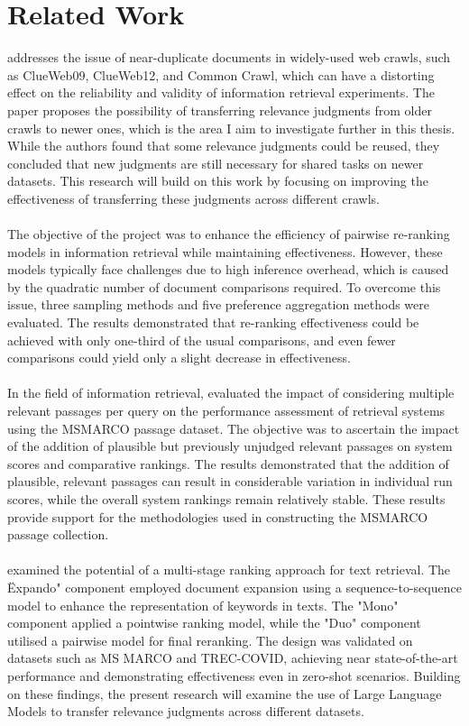 \chapter{Related Work}\label{related-work}

\cite{froebe:2021} addresses the issue of near-duplicate documents in widely-used web crawls, such as ClueWeb09, ClueWeb12, and Common Crawl, which can have a distorting effect on the reliability and validity of information retrieval experiments. The paper proposes the possibility of transferring relevance judgments from older crawls to newer ones, which is the area I aim to investigate further in this thesis. While the authors found that some relevance judgments could be reused, they concluded that new judgments are still necessary for shared tasks on newer datasets. This research will build on this work by focusing on improving the effectiveness of transferring these judgments across different crawls.
\\\\
The objective of the \citet{gienapp:2022} project was to enhance the efficiency of pairwise re-ranking models in information retrieval while maintaining effectiveness. However, these models typically face challenges due to high inference overhead, which is caused by the quadratic number of document comparisons required. To overcome this issue, three sampling methods and five preference aggregation methods were evaluated. The results demonstrated that re-ranking effectiveness could be achieved with only one-third of the usual comparisons, and even fewer comparisons could yield only a slight decrease in effectiveness.
\\\\
In the field of information retrieval, \citet{mackenzie:2021} evaluated the impact of considering multiple relevant passages per query on the performance assessment of retrieval systems using the MSMARCO passage dataset. The objective was to ascertain the impact of the addition of plausible but previously unjudged relevant passages on system scores and comparative rankings. The results demonstrated that the addition of plausible, relevant passages can result in considerable variation in individual run scores, while the overall system rankings remain relatively stable. These results provide support for the methodologies used in constructing the MSMARCO passage collection.
\\\\
\citet{pradeep:2021} examined the potential of a multi-stage ranking approach for text retrieval. The \"Expando" component employed document expansion using a sequence-to-sequence model to enhance the representation of keywords in texts. The "Mono" component applied a pointwise ranking model, while the "Duo" component utilised a pairwise model for final reranking. The design was validated on datasets such as MS MARCO and TREC-COVID, achieving near state-of-the-art performance and demonstrating effectiveness even in zero-shot scenarios. Building on these findings, the present research will examine the use of Large Language Models to transfer relevance judgments across different datasets.
